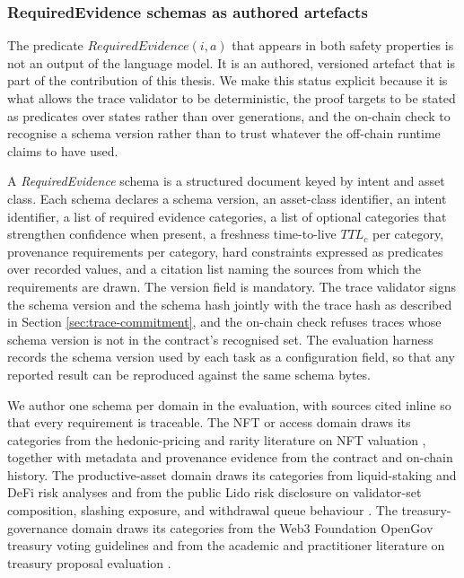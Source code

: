 \subsubsection{RequiredEvidence schemas as authored artefacts}
\label{sec:required-evidence-schemas}

The predicate $\textit{RequiredEvidence}(i, a)$ that appears in both safety properties is not an output of the language model. It is an authored, versioned artefact that is part of the contribution of this thesis. We make this status explicit because it is what allows the trace validator to be deterministic, the proof targets to be stated as predicates over states rather than over generations, and the on-chain check to recognise a schema version rather than to trust whatever the off-chain runtime claims to have used.

A \textit{RequiredEvidence} schema is a structured document keyed by intent and asset class. Each schema declares a schema version, an asset-class identifier, an intent identifier, a list of required evidence categories, a list of optional categories that strengthen confidence when present, a freshness time-to-live $\textit{TTL}_c$ per category, provenance requirements per category, hard constraints expressed as predicates over recorded values, and a citation list naming the sources from which the requirements are drawn. The version field is mandatory. The trace validator signs the schema version and the schema hash jointly with the trace hash as described in Section \ref{sec:trace-commitment}, and the on-chain check refuses traces whose schema version is not in the contract's recognised set. The evaluation harness records the schema version used by each task as a configuration field, so that any reported result can be reproduced against the same schema bytes.

We author one schema per domain in the evaluation, with sources cited inline so that every requirement is traceable. The NFT or access domain draws its categories from the hedonic-pricing and rarity literature on NFT valuation \cite{Lohmer2024, Ante2021, Dowling2022, Nadini2021, Kong2021}, together with metadata and provenance evidence from the contract and on-chain history. The productive-asset domain draws its categories from liquid-staking and DeFi risk analyses \cite{frangella2022aave, gambacorta2024defi} and from the public Lido risk disclosure on validator-set composition, slashing exposure, and withdrawal queue behaviour \cite{LidoRisk}. The treasury-governance domain draws its categories from the Web3 Foundation OpenGov treasury voting guidelines and from the academic and practitioner literature on treasury proposal evaluation \cite{W3FOpenGovVotingGuidelines, Rodrigues2022, Valastin2024proto}.

